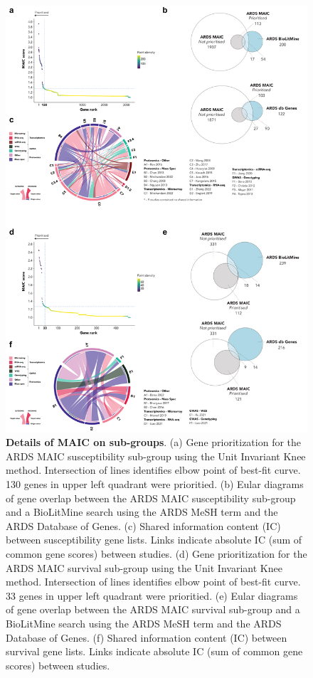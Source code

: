 \documentclass[
  11,
  a4paper,
]{article}
\begin{document}
\begin{figure}

{\centering \includegraphics{../img/Supplementary_Figure_6.png}

}

\caption{\textbf{Details of MAIC on sub-groups}. (a) Gene prioritization
for the ARDS MAIC susceptibility sub-group using the Unit Invariant Knee
method. Intersection of lines identifies elbow point of best-fit curve.
130 genes in upper left quadrant were prioritied. (b) Eular diagrams of
gene overlap between the ARDS MAIC susceptibility sub-group and a
BioLitMine search using the ARDS MeSH term and the ARDS Database of
Genes. (c) Shared information content (IC) between susceptibility gene
lists. Links indicate absolute IC (sum of common gene scores) between
studies. (d) Gene prioritization for the ARDS MAIC survival sub-group
using the Unit Invariant Knee method. Intersection of lines identifies
elbow point of best-fit curve. 33 genes in upper left quadrant were
prioritied. (e) Eular diagrams of gene overlap between the ARDS MAIC
survival sub-group and a BioLitMine search using the ARDS MeSH term and
the ARDS Database of Genes. (f) Shared information content (IC) between
survival gene lists. Links indicate absolute IC (sum of common gene
scores) between studies.}

\end{figure}
\end{document}
